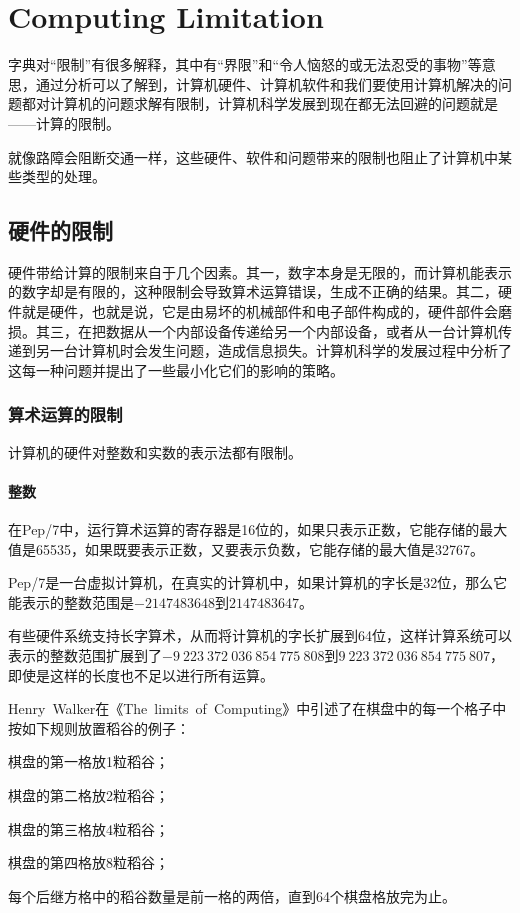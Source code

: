 \part{Computing Limitation}

字典对“限制”有很多解释，其中有“界限”和“令人恼怒的或无法忍受的事物”等意思，通过分析可以了解到，计算机硬件、计算机软件和我们要使用计算机解决的问题都对计算机的问题求解有限制，计算机科学发展到现在都无法回避的问题就是——计算的限制。

就像路障会阻断交通一样，这些硬件、软件和问题带来的限制也阻止了计算机中某些类型的处理。

\chapter{硬件的限制}

硬件带给计算的限制来自于几个因素。其一，数字本身是无限的，而计算机能表示的数字却是有限的，这种限制会导致算术运算错误，生成不正确的结果。其二，硬件就是硬件，也就是说，它是由易坏的机械部件和电子部件构成的，硬件部件会磨损。其三，在把数据从一个内部设备传递给另一个内部设备，或者从一台计算机传递到另一台计算机时会发生问题，造成信息损失。计算机科学的发展过程中分析了这每一种问题并提出了一些最小化它们的影响的策略。

\section{算术运算的限制}

计算机的硬件对整数和实数的表示法都有限制。

\subsection{整数}

在Pep/7中，运行算术运算的寄存器是16位的，如果只表示正数，它能存储的最大值是65535，如果既要表示正数，又要表示负数，它能存储的最大值是32767。

Pep/7是一台虚拟计算机，在真实的计算机中，如果计算机的字长是32位，那么它能表示的整数范围是$-2147483648$到$2147483647$。

有些硬件系统支持长字算术，从而将计算机的字长扩展到64位，这样计算系统可以表示的整数范围扩展到了$-9~223~372~036~854~775~808$到$9~223~372~036~854~775~807$，即使是这样的长度也不足以进行所有运算。

Henry~Walker在《The~limits~of~Computing》中引述了在棋盘中的每一个格子中按如下规则放置稻谷的例子：

\begin{compactitem}
\item 棋盘的第一格放1粒稻谷；
\item 棋盘的第二格放2粒稻谷；
\item 棋盘的第三格放4粒稻谷；
\item 棋盘的第四格放8粒稻谷；
\item 每个后继方格中的稻谷数量是前一格的两倍，直到64个棋盘格放完为止。
\end{compactitem}

